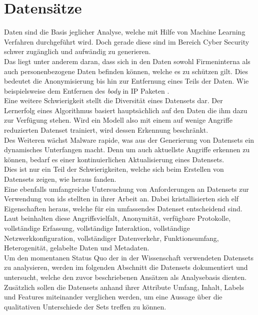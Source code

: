 \documentclass[
    12pt, %
    DIV10,
    ngerman, %
    a4paper, %
    oneside, %
    titlepage, %
    parskip=half, %
    headings=normal, %
    listof=totoc, %
    bibliography=totoc, %
    index=totoc, %
    captions=tableheading, %
    final %
]{scrreprt}
\begin{document}
\chapter{Datensätze}\label{ch:d}
Daten sind die Basis jeglicher Analyse, welche mit Hilfe von Machine Learning Verfahren durchgeführt wird. Doch gerade diese sind im Bereich Cyber Security schwer zugänglich und aufwändig zu generieren.\\ 
Das liegt unter anderem daran, dass sich in den Daten sowohl Firmeninterna als auch personenbezogene Daten befinden können, welche es zu schützen gilt. Dies bedeutet die Anonymisierung bis hin zur Entfernung eines Teils der Daten. Wie beispielsweise dem Entfernen des \emph{body} in IP Paketen \parencite{Uramova2018}.\\
Eine weitere Schwierigkeit stellt die Diversität eines Datensets dar. Der Lernerfolg eines Algorithmus basiert hauptsächlich auf den Daten die ihm dazu zur Verfügung stehen. Wird ein Modell also mit einem auf wenige Angriffe reduzierten Datenset trainiert, wird dessen Erkennung beschränkt.\\
Des Weiteren wächst Malware rapide, was aus der Generierung von Datensets ein dynamisches Unterfangen macht. Denn um auch aktuellste Angriffe erkennen zu können, bedarf es einer kontinuierlichen Aktualisierung eines Datensets.\\
Dies ist nur ein Teil der Schwierigkeiten, welche sich beim Erstellen von Datensets zeigen, wie \textcite{Uramova2018} heraus fanden.\\
Eine ebenfalls umfangreiche Untersuchung von Anforderungen an Datensets zur Verwendung von \ac{ids} stellten \textcite{7885840} in ihrer Arbeit an. Dabei kristallisierten sich elf  Eigenschaften heraus, welche für ein umfassendes Datenset entscheidend sind. Laut \citeauthor{7885840} beinhalten diese Angriffsvielfalt, Anonymität, verfügbare Protokolle, vollständige Erfassung,
vollständige Interaktion, vollständige Netzwerkkonfiguration, vollständiger Datenverkehr, Funktionsumfang, Heterogenität, gelabelte Daten und Metadaten.\\
Um den momentanen Status Quo der in der Wissenschaft verwendeten Datensets zu analysieren, werden im folgenden Abschnitt die Datensets dokumentiert und untersucht, welche den zuvor beschriebenen Ansätzen als Analysebasis dienten. Zusätzlich sollen die Datensets anhand ihrer Attribute Umfang, Inhalt, Labels und Features miteinander verglichen werden, um eine Aussage über die qualitativen Unterschiede der Sets treffen zu können.
\end{document}
